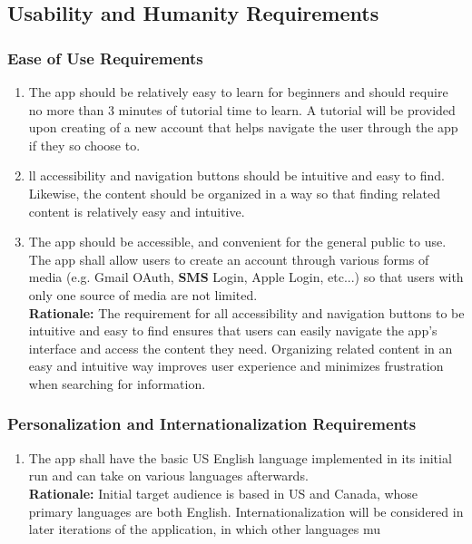 \documentclass[]{article}
\begin{document}

\subsection{Usability and Humanity Requirements}
\label{sub:usability_and_humanity_requirements}

\subsubsection{Ease of Use Requirements}
\label{ssub:ease_of_use_requirements}
\begin{enumerate}[{UH-EOU}1. ]
	\item The app should be relatively easy to learn for beginners and should require no more than 3 minutes of tutorial time to learn. A tutorial will be provided upon creating of a new account that helps navigate the user through the app if they so choose to.
	\item ll accessibility and navigation buttons should be intuitive and easy to find. Likewise, the content should be organized in a way so that finding related content is relatively easy and intuitive.
	\item The app should be accessible, and convenient for the general public to use. The app shall allow users to create an account through various forms of media (e.g. Gmail OAuth, \textbf{SMS} Login, Apple Login, etc...) so that users with only one source of media are not limited.\\
	{\bf Rationale:} The requirement for all accessibility and navigation buttons to be intuitive and easy to find ensures that users can easily navigate the app's interface and access the content they need. Organizing related content in an easy and intuitive way improves user experience and minimizes frustration when searching for information.
\end{enumerate}

\subsubsection{Personalization and Internationalization Requirements}
\label{ssub:personalization_and_internationalization_requirements}
\begin{enumerate}[{UH-PI}1. ]
	\item The app shall have the basic US English language implemented in its initial run and can take on various languages afterwards.\\
	{\bf Rationale:} Initial target audience is based in US and Canada, whose primary languages are both English. Internationalization will be considered in later iterations of the application, in which other languages mu
\end{enumerate}
\end{document}
